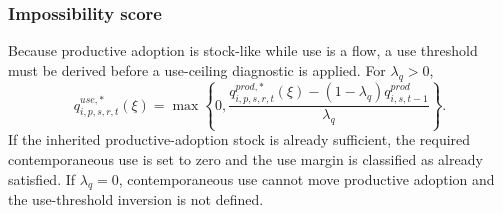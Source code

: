 \documentclass[11pt,a4paper]{article}
\begin{document}
\subsubsection{Impossibility score}\label{subsec:impossibility_score}

Because productive adoption is stock-like while use is a flow, a use threshold must be derived before a use-ceiling diagnostic is applied. For $\lambda_q>0$,
\begin{equation}\label{eq:q_use_star_v11}
    q^{use,*}_{i,p,s,r,t}(\xi)=\max\left\{0,
    \frac{q^{prod,*}_{i,p,s,r,t}(\xi)-(1-\lambda_q)q^{prod}_{i,s,t-1}}{\lambda_q}
    \right\}.
\end{equation}
If the inherited productive-adoption stock is already sufficient, the required contemporaneous use is set to zero and the use margin is classified as already satisfied. If $\lambda_q=0$, contemporaneous use cannot move productive adoption and the use-threshold inversion is not defined.
\end{document}

